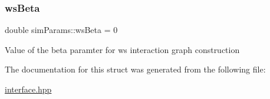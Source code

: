 \subsubsection{\texorpdfstring{ws\+Beta}{wsBeta}}
{\footnotesize\ttfamily double sim\+Params\+::ws\+Beta = 0}

Value of the beta paramter for ws interaction graph construction 

The documentation for this struct was generated from the following file\+:\begin{DoxyCompactItemize}
\item 
\hyperlink{interface_8hpp}{interface.\+hpp}\end{DoxyCompactItemize}
